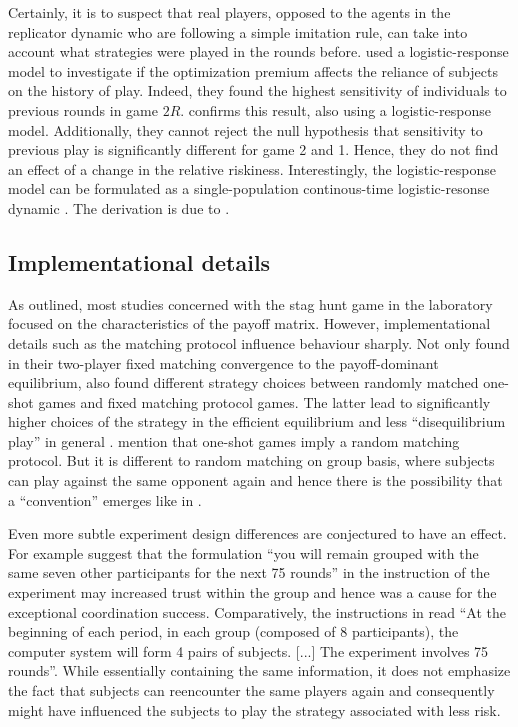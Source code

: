 Certainly, it is to suspect that real players, opposed to the agents
in the replicator dynamic who are following a simple imitation rule,
can take into account what strategies were played in the rounds before.
\textcite{battalio_optimization_2001} used a logistic-response model to
investigate if the optimization premium affects the reliance of subjects
on the history of play. Indeed, they found the highest sensitivity of 
individuals to previous rounds in game $2R$.
\textcite{dubois_optimization_2012} confirms this result, also using 
a logistic-response model. Additionally, they cannot reject the null
hypothesis that sensitivity to previous play is significantly different for
game 2 and 1. Hence, they do not find an effect of a change in the
relative riskiness. Interestingly, the logistic-response model can be
formulated as a single-population continous-time logistic-resonse dynamic
\parencite[752]{battalio_optimization_2001}. The derivation is due to
\textcite{fudenberg_theory_1998}. 


\subsection{Implementational details}
As outlined, most studies concerned with the stag hunt game in the 
laboratory focused on the characteristics of the payoff matrix. 
However, implementational details 
such as the matching protocol influence behaviour sharply. Not only 
\textcite{van_huyck_tacit_1990} found in their two-player fixed matching
convergence to the payoff-dominant equilibrium, 
\textcite{clark_repetition_2001} also found different strategy 
choices between randomly matched one-shot games and fixed matching protocol 
games. The latter lead to significantly higher choices of the strategy 
in the efficient equilibrium and less ``disequilibrium play'' in general
\parencite[]{clark_repetition_2001}. 
\textcite{devetag_when_2007} mention that one-shot games imply a 
random matching protocol. But it is different to random matching on group
basis, where subjects can play against the same opponent again 
and hence there is the possibility that a ``convention'' emerges like in 
\textcite{rankin_strategic_2000}.

Even more subtle experiment design differences are conjectured to have an
effect. For example \textcite{devetag_when_2007} suggest that the formulation
``you will remain grouped with the same seven other participants for the next
75 rounds'' in the instruction of the \textcite{rankin_strategic_2000}  
experiment may increased trust within the group and hence was a 
cause for the exceptional coordination success. Comparatively, the 
instructions in \textcite{dubois_optimization_2012} read ``At the beginning
of each period, in each group (composed of 8 participants), the computer
system will form 4 pairs of subjects. [...] The experiment 
involves 75 rounds''\parencite[378]{dubois_optimization_2012}. 
While essentially containing the same information,
it does not emphasize the fact that subjects can reencounter the same 
players again and consequently might have influenced the subjects to play
the strategy associated with less risk.

